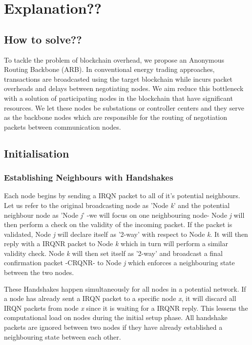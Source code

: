 \chapter{Explanation??}\label{ch:explanation}

\section{How to solve??}

To tackle the problem of blockchain overhead, we propose an Anonymous Routing Backbone (ARB). In conventional energy trading approaches, transactions are broadcasted using the target blockchain while incurs packet overheads and delays between negotiating nodes. We aim reduce this bottleneck with a solution of participating nodes in the blockchain that have significant resources. We let these nodes be substations or controller centers and they serve as the backbone nodes which are responsible for the routing of negotiation packets between communication nodes. 

\section{Initialisation}

\subsection{Establishing Neighbours with Handshakes}

Each node begins by sending a IRQN packet to all of it's potential neighbours. Let us refer to the original broadcasting node as 'Node \textit{k}' and the potential neighbour node as 'Node \textit{j}' -we will focus on one neighbouring node- Node \textit{j} will then perform a check on the validity of the incoming packet. If the packet is validated, Node \textit{j} will declare itself as '2-way' with respect to Node \textit{k}. It will then reply with a IRQNR packet to Node \textit{k} which in turn will perform a similar validity check. Node \textit{k} will then set itself as '2-way' and broadcast a final confirmation packet -CRQNR- to Node \textit{j} which enforces a neighbouring state between the two nodes.

These Handshakes happen simultaneously for all nodes in a potential network. If a node has already sent a IRQN packet to a specific node \textit{x}, it will discard all IRQN packets from node \textit{x} since it is waiting for a IRQNR reply. This lessens the computational load on nodes during the initial setup phase. All handshake packets are ignored between two nodes if they have already established a neighbouring state between each other.

